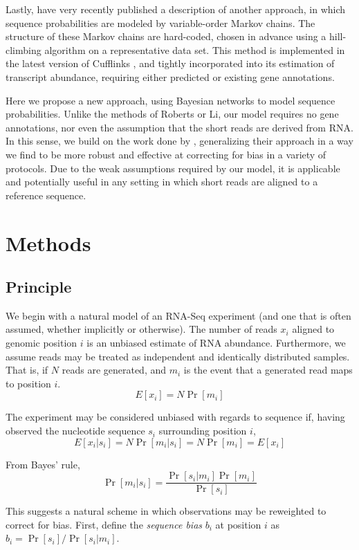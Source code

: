 \documentclass{bioinfo}
\begin{document}
Lastly, \citet{Roberts2011} have very recently published a description of
another approach, in which sequence probabilities are modeled by variable-order
Markov chains. The structure of these Markov chains are hard-coded, chosen in
advance using a hill-climbing algorithm on a representative data set. This method
is implemented in the latest version of Cufflinks \citep{Trapnell2010}, and
tightly incorporated into its estimation of transcript abundance, requiring
either predicted or existing gene annotations.

Here we propose a new approach, using Bayesian networks to model sequence
probabilities. Unlike the methods of Roberts or Li, our model requires no gene
annotations, nor even the assumption that the short reads are derived from RNA.
In this sense, we build on the work done by \citet{Hansen2010}, generalizing
their approach in a way we find to be more robust and effective at correcting
for bias in a variety of protocols. Due to the weak assumptions required by our
model, it is applicable and potentially useful in any setting in which short
reads are aligned to a reference sequence.

\section{Methods}

\subsection{Principle}

We begin with a natural model of an RNA-Seq experiment (and one that is often
assumed, whether implicitly or otherwise). The number of reads $x_i$ aligned to
genomic position $i$ is an unbiased estimate of RNA abundance. Furthermore, we
assume reads may be treated as independent and identically distributed samples.
That is, if $N$ reads are generated, and $m_i$ is the event that a generated
read maps to position $i$.
$$ E[x_i] = N \Pr[m_i] $$

The experiment may be considered unbiased  with regards to sequence if, having
observed the nucleotide sequence $s_i$ surrounding position $i$,
$$ E[ x_i | s_i ] = N \Pr[ m_i | s_i ] = N \Pr[ m_i ] = E[ x_i ] $$

From Bayes' rule,
$$ \Pr[ m_i | s_i ] = \frac{ \Pr[ s_i | m_i ] \Pr[ m_i ] }{ \Pr[ s_i ] } $$

This suggests a natural scheme in which observations may be reweighted to
correct for bias.  First, define the \emph{sequence bias} $b_i$ at position $i$
as $ b_i = \Pr[ s_i ] /  \Pr[ s_i | m_i ]  $.
\end{document}
